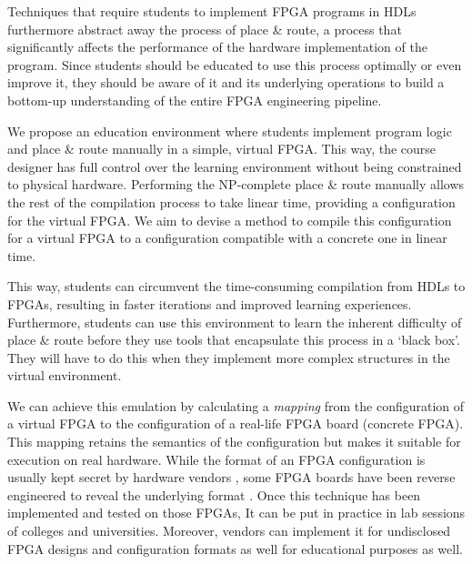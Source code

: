 Techniques that require students to implement FPGA programs in HDLs furthermore abstract away the process of place \& route, a process that significantly affects the performance of the hardware implementation of the program. Since students should be educated to use this process optimally or even improve it, they should be aware of it and its underlying operations to build a bottom-up understanding of the entire FPGA engineering pipeline.

We propose an education environment where students implement program logic and place \& route manually in a simple, virtual FPGA. This way, the course designer has full control over the learning environment without being constrained to physical hardware. Performing the NP-complete place \& route manually allows the rest of the compilation process to take linear time, providing a configuration for the virtual FPGA. We aim to devise a method to compile this configuration for a virtual FPGA to a configuration compatible with a concrete one in linear time.

This way, students can circumvent the time-consuming compilation from HDLs to FPGAs, resulting in faster iterations and improved learning experiences. Furthermore, students can use this environment to learn the inherent difficulty of place \& route before they use tools that encapsulate this process in a `black box'. They will have to do this when they implement more complex structures in the virtual environment.

We can achieve this emulation by calculating a \textit{mapping} from the configuration of a virtual FPGA to the configuration of a real-life FPGA board (concrete FPGA). This mapping retains the semantics of the configuration but makes it suitable for execution on real hardware. While the format of an FPGA configuration is usually kept secret by hardware vendors \cite{Hauck:2007:RCT:1564780, 8653869, 6339165}, some FPGA boards have been reverse engineered to reveal the underlying format \cite{Yu2018, trellis}. Once this technique has been implemented and tested on those FPGAs, It can be put in practice in lab sessions of colleges and universities. Moreover, vendors can implement it for undisclosed FPGA designs and configuration formats as well for educational purposes as well.


